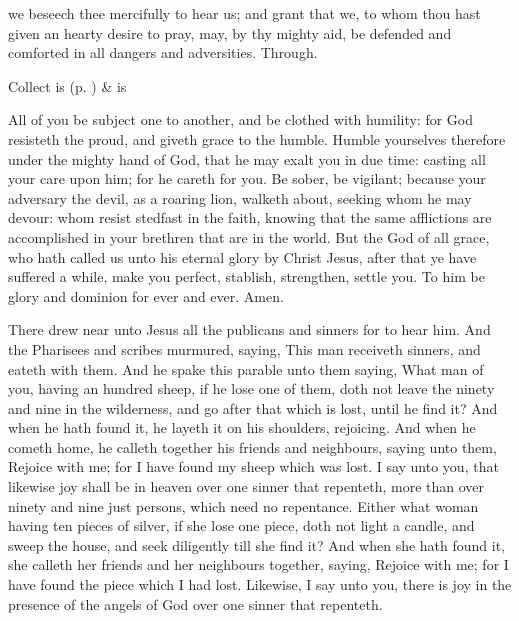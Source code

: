 \collect\label{TrinityIIICollect}
 we beseech thee mercifully to hear us; and grant that we, to whom thou hast given an hearty desire to pray, may, by thy mighty aid, be defended and comforted in all dangers and adversities. Through.
\begin{rubric}
     Collect is  (p. \pageref{SPSaints}) \&  is 
\end{rubric}

 All of you be subject one to another, and be clothed with humility: for God resisteth the proud, and giveth grace to the humble. Humble yourselves therefore under the mighty hand of God, that he may exalt you in due time: casting all your care upon him; for he careth for you. Be sober, be vigilant; because your adversary the devil, as a roaring lion, walketh about, seeking whom he may devour: whom resist stedfast in the faith, knowing that the same afflictions are accomplished in your brethren that are in the world. But the God of all grace, who hath called us unto his eternal glory by Christ Jesus, after that ye have suffered a while, make you perfect, stablish, strengthen, settle you. To him be glory and dominion for ever and ever. Amen.


\clearpage
{}
 There drew near unto Jesus all the publicans and sinners for to hear him. And the Pharisees and scribes murmured, saying, This man receiveth sinners, and eateth with them. And he spake this parable unto them saying, What man of you, having an hundred sheep, if he lose one of them, doth not leave the ninety and nine in the wilderness, and go after that which is lost, until he find it? And when he hath found it, he layeth it on his shoulders, rejoicing. And when he cometh home, he calleth together his friends and neighbours, saying unto them, Rejoice with me; for I have found my sheep which was lost. I say unto you, that likewise joy shall be in heaven over one sinner that repenteth, more than over ninety and nine just persons, which need no repentance. Either what woman having ten pieces of silver, if she lose one piece, doth not light a candle, and sweep the house, and seek diligently till she find it? And when she hath found it, she calleth her friends and her neighbours together, saying, Rejoice with me; for I have found the piece which I had lost. Likewise, I say unto you, there is joy in the presence of the angels of God over one sinner that repenteth.

